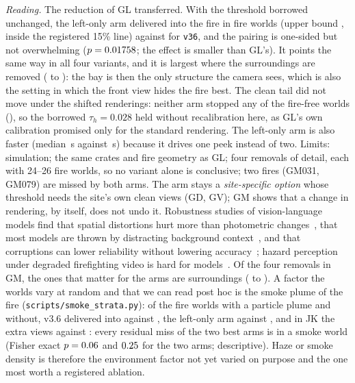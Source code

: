 \emph{Reading.} The reduction of GL transferred. With the threshold borrowed unchanged, the left-only arm delivered into the fire in \GMLeft{} fire worlds (upper bound \GMLeftUpper, inside the registered 15\% line) against \GMV{} for \texttt{v36}, and the pairing is one-sided but not overwhelming ($p=0.01758$; the effect is smaller than GL's). It points the same way in all four variants, and it is largest where the surroundings are removed (\GMSurrV{} to \GMSurrLeft{}): the bay is then the only structure the camera sees, which is also the setting in which the front view hides the fire best. The clean tail did not move under the shifted renderings: neither arm stopped any of the \GMPlain{} fire-free worlds (\GMFalseStops), so the borrowed $\tau_h=0.028$ held without recalibration here, as GL's own calibration promised only for the standard rendering. The left-only arm is also faster (median \GMTimeLeft\,s against \GMTimeV\,s) because it drives one peek instead of two. Limits: simulation; the same crates and fire geometry as GL; four removals of detail, each with 24--26 fire worlds, so no variant alone is conclusive; two fires (GM031, GM079) are missed by both arms. The arm stays a \emph{site-specific option} whose threshold needs the site's own clean views (GD, GV); GM shows that a change in rendering, by itself, does not undo it. Robustness studies of vision-language models find that spatial distortions hurt more than photometric changes~\cite{saxena2026vlmrobustbench}, that most models are thrown by distracting background context~\cite{patel2025pcri}, and that corruptions can lower reliability without lowering accuracy~\cite{usama2025corruptions}; hazard perception under degraded firefighting video is hard for models~\cite{tiwari2025fire360}. Of the four removals in GM, the ones that matter for the arms are surroundings (\GMSurrV{} to \GMSurrLeft{}). A factor the worlds vary at random and that we can read post hoc is the smoke plume of the fire (\texttt{scripts/smoke\_strata.py}): of the \SMV{} fire worlds with a particle plume and \SMNoV{} without, v3.6 delivered into \SMVSmoke{} against \SMVNoSmoke{}, the left-only arm \SMLeftSmoke{} against \SMLeftNoSmoke{}, and in JK the extra views \SMAdaptSmoke{} against \SMAdaptNoSmoke{}: every residual miss of the two best arms is in a smoke world (Fisher exact $p=0.06$ and $0.25$ for the two arms; descriptive). Haze or smoke density is therefore the environment factor not yet varied on purpose and the one most worth a registered ablation.
